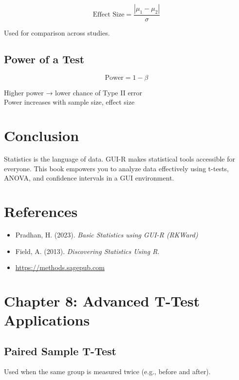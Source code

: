 \documentclass[
  letterpaper,
  DIV=11,
  numbers=noendperiod]{scrreprt}
\providecommand{\tightlist}{%
  \setlength{\itemsep}{0pt}\setlength{\parskip}{0pt}}
\begin{document}
\[
\text{Effect Size} = \frac{|\mu_1 - \mu_2|}{\sigma}
\]

Used for comparison across studies.

\subsection{Power of a Test}\label{power-of-a-test}

\[
\text{Power} = 1 - \beta
\]

Higher power → lower chance of Type II error\\
Power increases with sample size, effect size

\section{Conclusion}\label{conclusion}

Statistics is the language of data. GUI-R makes statistical tools
accessible for everyone. This book empowers you to analyze data
effectively using t-tests, ANOVA, and confidence intervals in a GUI
environment.

\section{References}\label{references}

\begin{itemize}
\tightlist
\item
  Pradhan, H. (2023). \emph{Basic Statistics using GUI-R (RKWard)}\\
\item
  Field, A. (2013). \emph{Discovering Statistics Using R}.\\
\item
  \url{https://methods.sagepub.com}
\end{itemize}

\section{Chapter 8: Advanced T-Test
Applications}\label{chapter-8-advanced-t-test-applications}

\subsection{Paired Sample T-Test}\label{paired-sample-t-test}

Used when the same group is measured twice (e.g., before and after).
\end{document}
